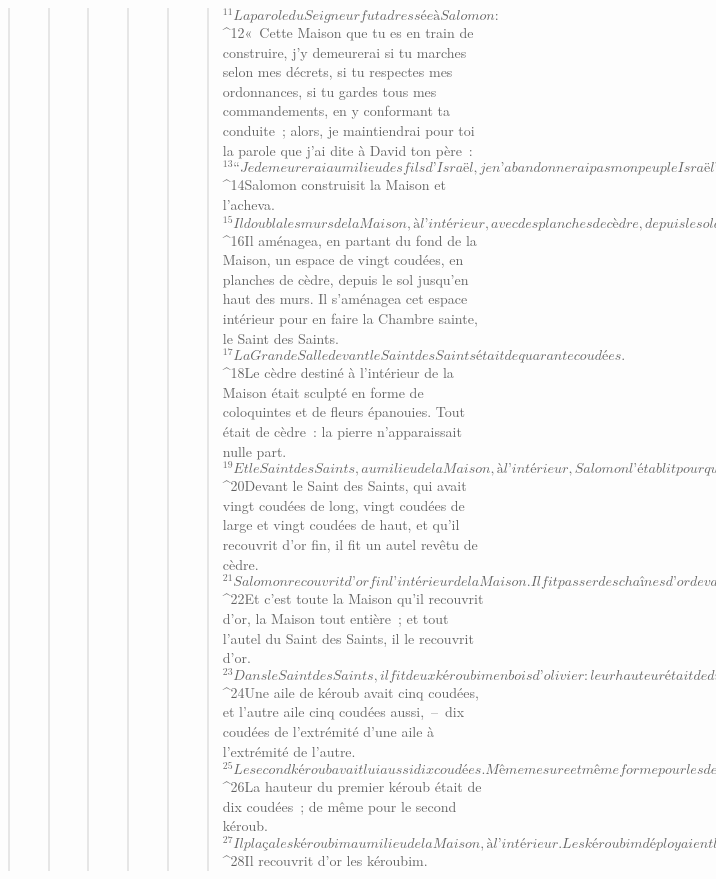 \begin{verse}
\begin{verse}
\begin{verse}
\begin{verse}
\begin{verse}
\begin{verse}
${}^{11}La parole du Seigneur fut adressée à Salomon : 
${}^{12}« Cette Maison que tu es en train de construire, j’y demeurerai si tu marches selon mes décrets, si tu respectes mes ordonnances, si tu gardes tous mes commandements, en y conformant ta conduite ; alors, je maintiendrai pour toi la parole que j’ai dite à David ton père : 
${}^{13}“Je demeurerai au milieu des fils d’Israël, je n’abandonnerai pas mon peuple Israël”. »
${}^{14}Salomon construisit la Maison et l’acheva. 
${}^{15}Il doubla les murs de la Maison, à l’intérieur, avec des planches de cèdre, depuis le sol de la Maison jusqu’en haut des murs. Le plafond, il le couvrit de bois, à l’intérieur, et il recouvrit le sol de la Maison d’un plancher de cyprès. 
${}^{16}Il aménagea, en partant du fond de la Maison, un espace de vingt coudées, en planches de cèdre, depuis le sol jusqu’en haut des murs. Il s’aménagea cet espace intérieur pour en faire la Chambre sainte, le Saint des Saints. 
${}^{17}La Grande Salle devant le Saint des Saints était de quarante coudées. 
${}^{18}Le cèdre destiné à l’intérieur de la Maison était sculpté en forme de coloquintes et de fleurs épanouies. Tout était de cèdre : la pierre n’apparaissait nulle part. 
${}^{19}Et le Saint des Saints, au milieu de la Maison, à l’intérieur, Salomon l’établit pour qu’on y dépose l’arche de l’Alliance du Seigneur. 
${}^{20}Devant le Saint des Saints, qui avait vingt coudées de long, vingt coudées de large et vingt coudées de haut, et qu’il recouvrit d’or fin, il fit un autel revêtu de cèdre. 
${}^{21}Salomon recouvrit d’or fin l’intérieur de la Maison. Il fit passer des chaînes d’or devant le Saint des Saints qu’il recouvrit d’or. 
${}^{22}Et c’est toute la Maison qu’il recouvrit d’or, la Maison tout entière ; et tout l’autel du Saint des Saints, il le recouvrit d’or. 
${}^{23}Dans le Saint des Saints, il fit deux kéroubim en bois d’olivier : leur hauteur était de dix coudées. 
${}^{24}Une aile de kéroub avait cinq coudées, et l’autre aile cinq coudées aussi, – dix coudées de l’extrémité d’une aile à l’extrémité de l’autre. 
${}^{25}Le second kéroub avait lui aussi dix coudées. Même mesure et même forme pour les deux kéroubim. 
${}^{26}La hauteur du premier kéroub était de dix coudées ; de même pour le second kéroub. 
${}^{27}Il plaça les kéroubim au milieu de la Maison, à l’intérieur. Les kéroubim déployaient leurs ailes : l’aile du premier kéroub touchait l’un des murs, et l’aile de l’autre kéroub touchait l’autre mur ; et au milieu de la Maison, leurs ailes se touchaient, aile contre aile. 
${}^{28}Il recouvrit d’or les kéroubim.

\end{verse}
\end{verse}
\end{verse}
\end{verse}
\end{verse}
\end{verse}
